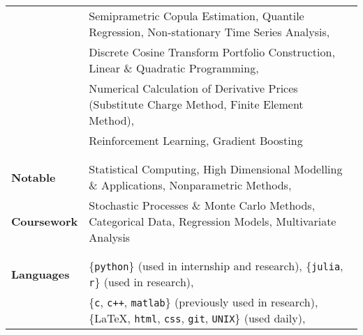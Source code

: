 \documentclass[utf8,letterpaper,oneside]{article}
\begin{document}
\begin{center}
\begin{tabular}{l l}
                           & Semiprametric Copula Estimation, Quantile Regression, Non-stationary Time Series Analysis,                                                       \\
                           & Discrete Cosine Transform Portfolio Construction, Linear \& Quadratic Programming,                                                               \\
                           & Numerical Calculation of Derivative Prices (Substitute Charge Method, Finite Element Method),                                                    \\
                           & {Reinforcement Learning}, {Gradient Boosting}                                                                                                    \\
                           &                                                                                                                                                  \\ \hline
                           &                                                                                                                                                  \\
  \textbf{Notable}         & Statistical Computing, {High Dimensional} Modelling \& Applications, {Nonparametric} Methods,                                                    \\
  \textbf{Coursework}      & Stochastic Processes \& Monte Carlo Methods, Categorical Data, Regression Models, Multivariate Analysis                                          \\
                           &                                                                                                                                                  \\ \hline
                           &                                                                                                                                                  \\
  \textbf{Languages}       & \{\texttt{python}\} (used in internship and research), \{\texttt{julia}, \texttt{r}\} (used in research),                                        \\ &\{\texttt{c}, \texttt{c++}, \texttt{matlab}\} (previously used in research), \{\LaTeX, \texttt{html}, \texttt{css}, \texttt{git}, \texttt{UNIX}\} (used daily),                  \\

\end{tabular}
\end{center}
\end{document}

